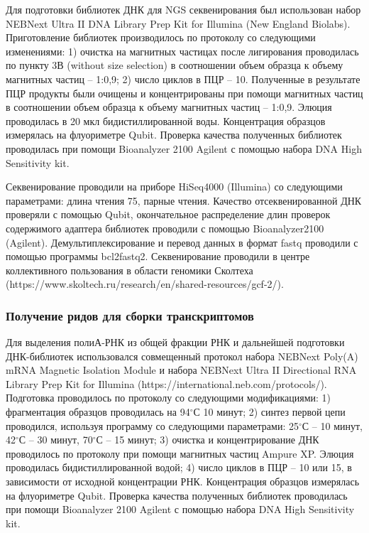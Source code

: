 Для подготовки библиотек ДНК для NGS секвенирования был использован набор NEBNext Ultra II DNA Library Prep Kit for Illumina (New England Biolabs). Приготовление библиотек производилось по протоколу со следующими изменениями: 1)  очистка на магнитных частицах после лигирования проводилась по пункту 3В (without size selection) в соотношении объем образца к объему магнитных частиц -- 1:0,9; 2) число циклов в ПЦР -- 10.
Полученные в результате ПЦР продукты были очищены и концентрированы при помощи магнитных частиц в соотношении объем образца к объему магнитных частиц -- 1:0,9. Элюция проводилась в 20 мкл бидистиллированной воды. Концентрация образцов измерялась на флуориметре Qubit.
Проверка качества полученных библиотек проводилась при помощи Bioanalyzer 2100 Agilent с помощью набора DNA High Sensitivity kit.

Секвенирование проводили на приборе HiSeq4000 (Illumina) со следующими параметрами: длина чтения 75, парные чтения. Качество отсеквенированной ДНК проверяли с помощью Qubit, окончательное распределение длин проверок содержимого адаптера библиотек проводили с помощью Bioanalyzer2100 (Agilent). Демультиплексирование и перевод данных в формат fastq проводили с помощью программы bcl2fastq2. Секвенирование проводили в центре коллективного пользования в области геномики Сколтеха (https://www.skoltech.ru/research/en/shared-resources/gcf-2/).


\subsubsection{Получение ридов для сборки транскриптомов}

Для выделения полиА-РНК из общей фракции РНК и дальнейшей подготовки ДНК-библиотек использовался совмещенный протокол набора NEBNext Poly(A) mRNA Magnetic Isolation Module и набора NEBNext Ultra II Directional RNA Library Prep Kit for Illumina (https://international.neb.com/protocols/). Подготовка проводилось по протоколу со следующими модификациями: 
1) фрагментация образцов проводилась на 94$^\circ$С 10 минут; 
2) синтез первой цепи проводился, используя программу со следующими параметрами: 25$^\circ$С -- 10 минут, 42$^\circ$С -- 30 минут, 70$^\circ$С -- 15 минут; 
3) очистка и концентрирование ДНК проводилось по протоколу при помощи магнитных частиц Ampure XP. Элюция проводилась бидистиллированной водой; 
4) число циклов в ПЦР -- 10 или 15, в зависимости от исходной концентрации РНК. 
Концентрация образцов измерялась на флуориметре Qubit. Проверка качества полученных библиотек проводилась при помощи Bioanalyzer 2100 Agilent с помощью набора DNA High Sensitivity kit. 

